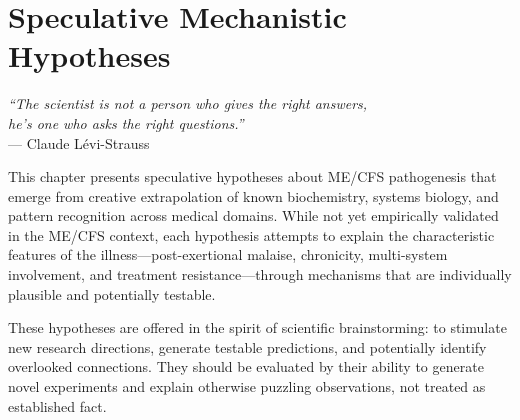 \chapter{Speculative Mechanistic Hypotheses}
\label{ch:speculative-hypotheses}

\begin{flushright}
\textit{``The scientist is not a person who gives the right answers,\\
he's one who asks the right questions.''}\\
--- Claude Lévi-Strauss
\end{flushright}

\vspace{1em}

This chapter presents speculative hypotheses about ME/CFS pathogenesis that emerge from creative extrapolation of known biochemistry, systems biology, and pattern recognition across medical domains. While not yet empirically validated in the ME/CFS context, each hypothesis attempts to explain the characteristic features of the illness---post-exertional malaise, chronicity, multi-system involvement, and treatment resistance---through mechanisms that are individually plausible and potentially testable.

These hypotheses are offered in the spirit of scientific brainstorming: to stimulate new research directions, generate testable predictions, and potentially identify overlooked connections. They should be evaluated by their ability to generate novel experiments and explain otherwise puzzling observations, not treated as established fact.


















